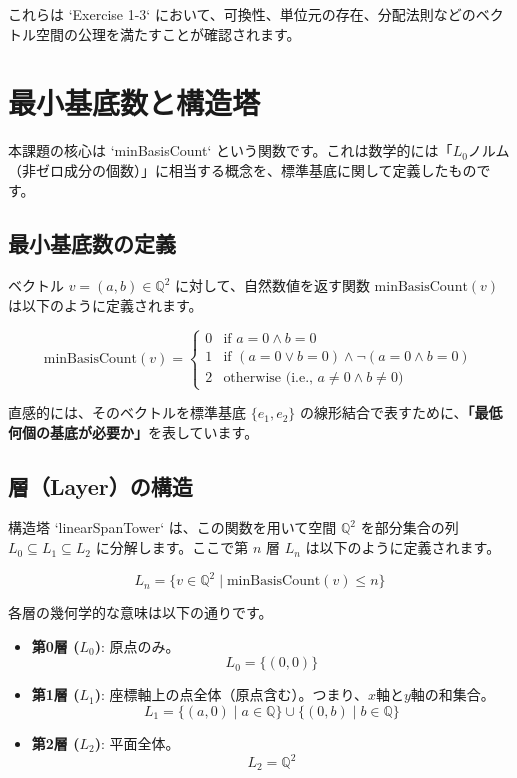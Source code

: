 \documentclass[judge=standard,11pt]{jlreq}
\theoremstyle{definition}
\newcommand{\Q}{\mathbb{Q}}
\newcommand{\VecQ}{\Q^2}
\newcommand{\minBasisCount}{\text{minBasisCount}}
\begin{document}
これらは `Exercise 1-3` において、可換性、単位元の存在、分配法則などのベクトル空間の公理を満たすことが確認されます。

\section{最小基底数と構造塔}

本課題の核心は `minBasisCount` という関数です。これは数学的には「$L_0$ノルム（非ゼロ成分の個数）」に相当する概念を、標準基底に関して定義したものです。

\subsection{最小基底数の定義}
ベクトル $v = (a, b) \in \VecQ$ に対して、自然数値を返す関数 $\minBasisCount(v)$ は以下のように定義されます。

\[
\minBasisCount(v) = 
\begin{cases} 
0 & \text{if } a = 0 \land b = 0 \\
1 & \text{if } (a = 0 \lor b = 0) \land \neg(a = 0 \land b = 0) \\
2 & \text{otherwise (i.e., } a \neq 0 \land b \neq 0)
\end{cases}
\]

直感的には、そのベクトルを標準基底 $\{e_1, e_2\}$ の線形結合で表すために、\textbf{「最低何個の基底が必要か」}を表しています。

\subsection{層（Layer）の構造}
構造塔 `linearSpanTower` は、この関数を用いて空間 $\VecQ$ を部分集合の列 $L_0 \subseteq L_1 \subseteq L_2$ に分解します。ここで第 $n$ 層 $L_n$ は以下のように定義されます。

\[ L_n = \{ v \in \VecQ \mid \minBasisCount(v) \le n \} \]

各層の幾何学的な意味は以下の通りです。

\begin{itemize}
    \item \textbf{第0層 ($L_0$)}: 原点のみ。
    \[ L_0 = \{ (0,0) \} \]
    \item \textbf{第1層 ($L_1$)}: 座標軸上の点全体（原点含む）。つまり、$x$軸と$y$軸の和集合。
    \[ L_1 = \{ (a, 0) \mid a \in \Q \} \cup \{ (0, b) \mid b \in \Q \} \]
    \item \textbf{第2層 ($L_2$)}: 平面全体。
    \[ L_2 = \VecQ \]
\end{itemize}
\end{document}
